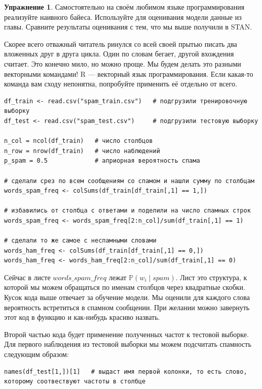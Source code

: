 \documentclass[12pt, a4paper, oneside]{extreport}
\def \mbb{\mathbb}
\def \PP{\mbb{P}}
\theoremstyle{plain}              %
\theoremstyle{definition}         %
\newtheorem{problem}{\color{myblue} Упражнение}
\begin{document}
\begin{problem}
Самостоятельно на своём любимом языке программирования реализуйте наивного байеса. Используйте для оценивания модели данные из главы. Сравните результаты оценивания с тем, что мы выше получили в STAN.

\begin{sol} 

Скорее всего отважный читатель ринулся со всей своей прытью писать два вложенных друг в друга цикла. Один по словам бегает, другой вхождения считает. Это конечно мило, но можно проще.  Мы будем делать это разными векторными командами! R --- векторный язык программирования. Если какая-то команда вам сходу непонятна, попробуйте применить её отдельно от всего. 

\begin{verbatim}
df_train <- read.csv("spam_train.csv")   # подгрузили тренировочную выборку
df_test <- read.csv("spam_test.csv")     # подгрузили тестовую выборку 

n_col = ncol(df_train)   # число столбцов
n_row = nrow(df_train)   # число наблюдений
p_spam = 0.5             # априорная вероятность спама 

# сделали срез по всем сообщениям со спамом и нашли сумму по столбцам
words_spam_freq <- colSums(df_train[df_train[,1] == 1,])

# избавились от столбца с ответами и поделили на число спамных строк
words_spam_freq <- words_spam_freq[2:n_col]/sum(df_train[,1] == 1)

# сделали то же самое с неспамными словами 
words_ham_freq <- colSums(df_train[df_train[,1] == 0,])
words_ham_freq <- words_ham_freq[2:n_col]/sum(df_train[,1] == 0)
\end{verbatim}

Сейчас в листе $words\_spam\_freq$ лежат $\PP(w_i \mid spam)$.  Лист это структура,  к которой мы можем обращаться по именам столбцов через квадратные скобки. Кусок кода выше отвечает за обучение модели. Мы оценили для каждого слова вероятность встретиться в спамном сообщении. При желании можно завернуть этот код в функцию и как-нибудь красиво назвать. 

Второй частью кода будет применение полученных частот к тестовой выборке.  Для первого наблюдения из тестовой выборки мы можем подсчитать спамность следующим образом: 


\begin{verbatim}
names(df_test[1,])[1]   # выдаст имя первой колонки, то есть слово,  которому соотвествуют частоты в столбце


\end{verbatim}
\end{sol}
\end{problem}
\end{document}
